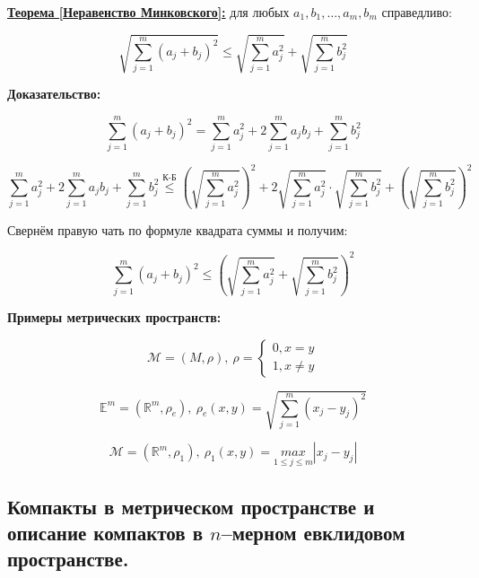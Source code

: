 \documentclass[a4paper,12pt]{article} %
\begin{document}
\underline{\textbf{Теорема [Неравенство Минковского]:}} для любых $a_1, b_1, \dots, a_m, b_m$ справедливо:

\begin{equation*}
    \sqrt{\sum\limits_{j = 1}^{m} (a_j + b_j)^2} \leqslant \sqrt{\sum\limits_{j = 1}^{m} a_j^2} + \sqrt{\sum\limits_{j = 1}^{m} b_j^2}
\end{equation*}

\textbf{Доказательство:} 

\[ \sum\limits_{j = 1}^{m} (a_j + b_j)^2 = \sum\limits_{j = 1}^{m} a_j^2 + 2\sum\limits_{j = 1}^{m} a_j b_j + \sum\limits_{j = 1}^{m} b_j^2 \]

\[ \sum\limits_{j = 1}^{m} a_j^2 + 2\sum\limits_{j = 1}^{m} a_j b_j + \sum\limits_{j = 1}^{m} b_j^2 \stackrel{\text{К-Б}}{\leqslant} \left( \sqrt{\sum\limits_{j = 1}^{m} a_j^2} \right)^2 + 2\sqrt{\sum\limits_{j = 1}^{m} a_j^2} \cdot \sqrt{\sum\limits_{j = 1}^{m} b_j^2} + \left( \sqrt{\sum\limits_{j = 1}^{m} b_j^2} \right)^2 \]

Свернём правую чать по формуле квадрата суммы и получим:

\[ \sum\limits_{j = 1}^{m} (a_j + b_j)^2 \leqslant \left( \sqrt{\sum\limits_{j = 1}^{m} a_j^2} + \sqrt{\sum\limits_{j = 1}^{m} b_j^2} \right)^2 \]

\textbf{Примеры метрических пространств:}

\begin{equation*}
    \mathscr{M} = (M, \rho), ~ \rho = 
    \begin{cases}
        0, x = y\\
        1, x \neq y
    \end{cases}
\end{equation*}

\begin{equation*}
    \mathbb{E}^m = (\mathbb{R}^m, \rho_e), ~ \rho_e(x, y) = \sqrt{\sum\limits_{j = 1}^m (x_j - y_j)^2}
\end{equation*}
    
\begin{equation*}
    \mathscr{M} = (\mathbb{R}^m, \rho_{1}), ~ \rho_{1}(x, y) = \underset{1 \leqslant j \leqslant m}{max} |x_j - y_j|
\end{equation*}

\subsection{Компакты в метрическом пространстве и описание компактов в $n$–мерном евклидовом пространстве.}
\end{document}
